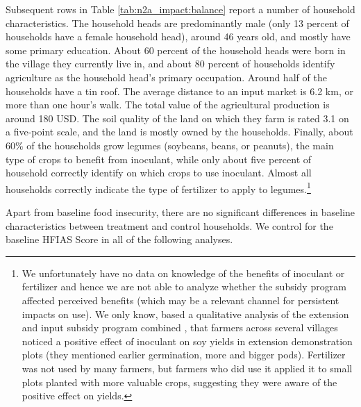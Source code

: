 Subsequent rows in Table \ref{tab:n2a_impact:balance} report a number of household characteristics. The household heads are predominantly male (only 13 percent of households have a female household head), around 46 years old, and mostly have some primary education. About 60 percent of the household heads were born in the village they currently live in, and about 80 percent of households identify agriculture as the household head’s primary occupation. Around half of the households have a tin roof. The average distance to an input market is 6.2 km, or more than one hour’s walk. The total value of the agricultural production is around 180 USD. The soil quality of the land on which they farm is rated 3.1 on a five-point scale, and the land is mostly owned by the households. Finally, about 60\% of the households grow legumes (soybeans, beans, or peanuts), the main type of crops to benefit from inoculant, while only about five percent of household correctly identify on which crops to use inoculant. Almost all households correctly indicate the type of fertilizer to apply to legumes.\footnote{We unfortunately have no data on knowledge of the benefits of inoculant or fertilizer and hence we are not able to analyze whether the subsidy program affected perceived benefits (which may be a relevant channel for persistent impacts on use). We only know, based a qualitative analysis of the extension and input subsidy program combined \citep{Kendzior2015}, that farmers across several villages noticed a positive effect of inoculant on soy yields in extension demonstration plots (they mentioned earlier germination, more and bigger pods). Fertilizer was not used by many farmers, but farmers who did use it applied it to small plots planted with more valuable crops, suggesting they were aware of the positive effect on yields.}

Apart from baseline food insecurity, there are no significant differences in baseline characteristics between treatment and control households. We control for the baseline HFIAS Score in all of the following analyses.


